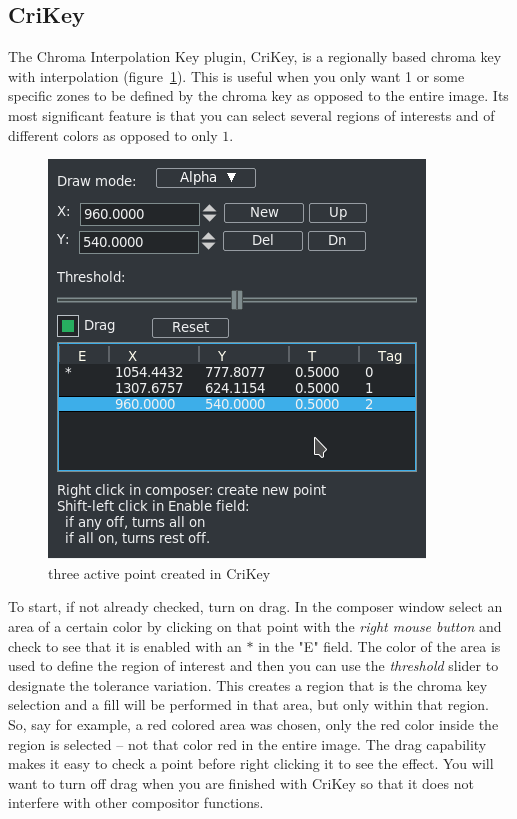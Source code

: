 \subsection{CriKey}%
\label{sub:crikey}

The Chroma Interpolation Key plugin, CriKey, is a regionally based chroma key with interpolation (figure~\ref{fig:crikey}). This is useful when you only want 1 or some specific zones to be defined by the chroma key as opposed to the entire image. Its most significant feature is that you can select several regions of interests and of different colors as opposed to only $1$.

\begin{figure}[htpb]
    \centering
    \includegraphics[width=0.5\linewidth]{images/crikey.png}
    \caption{three active point created in CriKey}
    \label{fig:crikey}
\end{figure}

To start, if not already checked, turn on drag. In the composer window select an area of a certain color by clicking on that point with the \textit{right mouse button} and check to see that it is enabled with an $*$ in the "E" field. The color of the area is used to define the region of interest and then you can use the \textit{threshold} slider to designate the tolerance variation. This creates a region that is the chroma key selection and a fill will be performed in that area, but only within that region. So, say for example, a red colored area was chosen, only the red color inside the region is selected -- not that color red in the entire image. The drag capability makes it easy to check a point before right clicking it to see the effect. You will want to turn off drag when you are finished with CriKey so that it does not interfere with other compositor functions.

